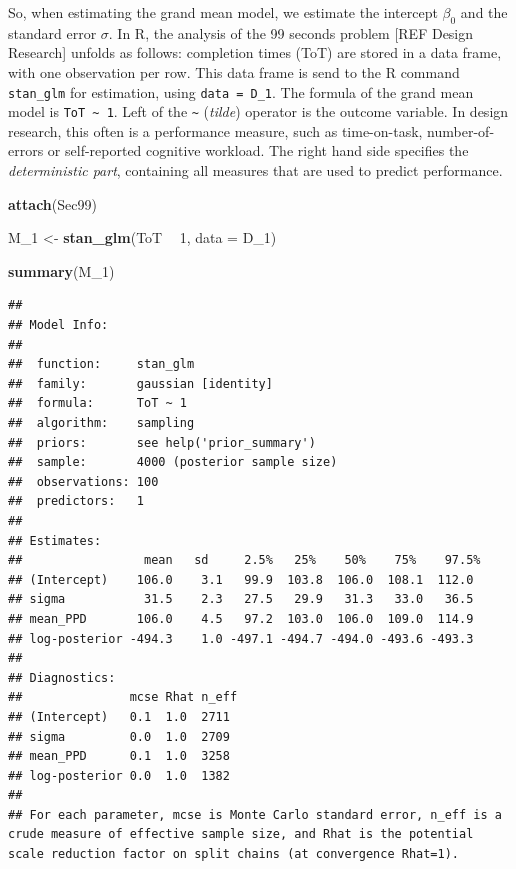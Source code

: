 \documentclass[]{svmono}
\newenvironment{Shaded}{\begin{snugshade}}{\end{snugshade}}
\newcommand{\KeywordTok}[1]{\textcolor[rgb]{0.13,0.29,0.53}{\textbf{#1}}}
\newcommand{\DataTypeTok}[1]{\textcolor[rgb]{0.13,0.29,0.53}{#1}}
\newcommand{\DecValTok}[1]{\textcolor[rgb]{0.00,0.00,0.81}{#1}}
\newcommand{\StringTok}[1]{\textcolor[rgb]{0.31,0.60,0.02}{#1}}
\newcommand{\OperatorTok}[1]{\textcolor[rgb]{0.81,0.36,0.00}{\textbf{#1}}}
\newcommand{\NormalTok}[1]{#1}
\begin{document}
So, when estimating the grand mean model, we estimate the intercept
\(\beta_0\) and the standard error \(\sigma\). In R, the analysis of the
99 seconds problem {[}REF Design Research{]} unfolds as follows:
completion times (ToT) are stored in a data frame, with one observation
per row. This data frame is send to the R command \texttt{stan\_glm} for
estimation, using \texttt{data\ =\ D\_1}. The formula of the grand mean
model is \texttt{ToT\ \textasciitilde{}\ 1}. Left of the
\texttt{\textasciitilde{}} (\emph{tilde}) operator is the outcome
variable. In design research, this often is a performance measure, such
as time-on-task, number-of-errors or self-reported cognitive workload.
The right hand side specifies the \emph{deterministic part}, containing
all measures that are used to predict performance.

\begin{Shaded}
\begin{Highlighting}[]
\KeywordTok{attach}\NormalTok{(Sec99)}
\end{Highlighting}
\end{Shaded}

\begin{Shaded}
\begin{Highlighting}[]
\NormalTok{M_}\DecValTok{1}\NormalTok{ <-}\StringTok{ }\KeywordTok{stan_glm}\NormalTok{(ToT }\OperatorTok{~}\StringTok{ }\DecValTok{1}\NormalTok{, }\DataTypeTok{data =}\NormalTok{ D_}\DecValTok{1}\NormalTok{)}
\end{Highlighting}
\end{Shaded}

\begin{Shaded}
\begin{Highlighting}[]
\KeywordTok{summary}\NormalTok{(M_}\DecValTok{1}\NormalTok{)}
\end{Highlighting}
\end{Shaded}

\begin{verbatim}
## 
## Model Info:
## 
##  function:     stan_glm
##  family:       gaussian [identity]
##  formula:      ToT ~ 1
##  algorithm:    sampling
##  priors:       see help('prior_summary')
##  sample:       4000 (posterior sample size)
##  observations: 100
##  predictors:   1
## 
## Estimates:
##                 mean   sd     2.5%   25%    50%    75%    97.5%
## (Intercept)    106.0    3.1   99.9  103.8  106.0  108.1  112.0 
## sigma           31.5    2.3   27.5   29.9   31.3   33.0   36.5 
## mean_PPD       106.0    4.5   97.2  103.0  106.0  109.0  114.9 
## log-posterior -494.3    1.0 -497.1 -494.7 -494.0 -493.6 -493.3 
## 
## Diagnostics:
##               mcse Rhat n_eff
## (Intercept)   0.1  1.0  2711 
## sigma         0.0  1.0  2709 
## mean_PPD      0.1  1.0  3258 
## log-posterior 0.0  1.0  1382 
## 
## For each parameter, mcse is Monte Carlo standard error, n_eff is a crude measure of effective sample size, and Rhat is the potential scale reduction factor on split chains (at convergence Rhat=1).
\end{verbatim}
\end{document}
